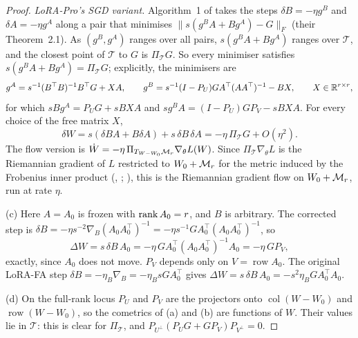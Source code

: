 \begin{proof}
\emph{LoRA-Pro's SGD variant.} Algorithm~1 of \citet{wang2024lorac} takes the steps $\delta B=-\eta g^B$ and
$\delta A=-\eta g^A$ along a pair that minimises $\lVert s(g^BA+Bg^A)-G\rVert_F$ (their Theorem~2.1). As $(g^B,g^A)$
ranges over all pairs, $s(g^BA+Bg^A)$ ranges over $\mathcal T$, and the closest point of $\mathcal T$ to $G$ is
$\Pi_{\mathcal T}G$. So every minimiser satisfies $s(g^BA+Bg^A)=\Pi_{\mathcal T}G$; explicitly, the minimisers are
\[g^A=s^{-1}(B^\top B)^{-1}B^\top G+XA,\qquad g^B=s^{-1}(I-P_U)GA^\top(AA^\top)^{-1}-BX,\qquad X\in\mathbb{R}^{r\times r},\]
for which $sBg^A=P_UG+sBXA$ and $sg^BA=(I-P_U)GP_V-sBXA$. For every choice of the free matrix $X$,
\[\delta W=s(\delta BA+B\delta A)+s\,\delta B\,\delta A=-\eta\,\Pi_{\mathcal T}G+O(\eta^2).\]
The flow version is $\dot W=-\eta\,\Pi_{T_{W-W_0}\mathcal{M}_r}\nabla_\theta L(W)$. Since $\Pi_{\mathcal T}\nabla_\theta L$ is the
Riemannian gradient of $L$ restricted to $W_0+\mathcal{M}_r$ for the metric induced by the Frobenius inner product
(, ; \citealp[Ch.~3]{xabsil2008optimization}), this is the Riemannian gradient flow on $W_0+\mathcal{M}_r$, run at
rate $\eta$.

(c) Here $A=A_0$ is frozen with $\operatorname{rank} A_0=r$, and $B$ is arbitrary. The corrected step is
$\delta B=-\eta s^{-2}\nabla_B(A_0A_0^\top)^{-1}=-\eta s^{-1}GA_0^\top(A_0A_0^\top)^{-1}$, so
\[\Delta W=s\,\delta B\,A_0=-\eta\,GA_0^\top(A_0A_0^\top)^{-1}A_0=-\eta\,GP_V,\]
exactly, since $A_0$ does not move. $P_V$ depends only on $V=\operatorname{row}A_0$. The original LoRA-FA step
$\delta B=-\eta_B\nabla_B=-\eta_BsGA_0^\top$ gives $\Delta W=s\,\delta B\,A_0=-s^2\eta_BGA_0^\top A_0$.

(d) On the full-rank locus $P_U$ and $P_V$ are the projectors onto $\operatorname{col}(W-W_0)$ and
$\operatorname{row}(W-W_0)$, so the cometrics of (a) and (b) are functions of $W$. Their values lie in $\mathcal T$:
this is clear for $\Pi_{\mathcal T}$, and $P_{U^\perp}(P_UG+GP_V)P_{V^\perp}=0$.


\end{proof}
